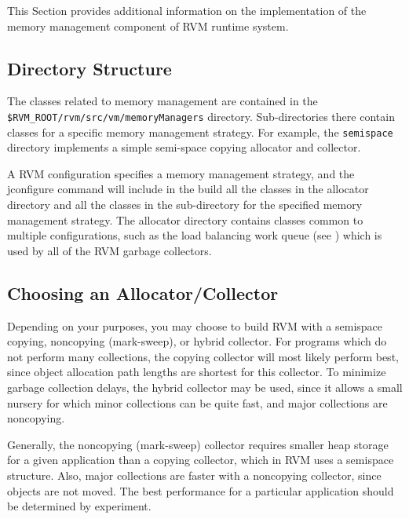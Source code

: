 This Section provides additional information on the implementation
of the memory management component of RVM runtime system.
 
\subsection{Directory Structure} \label{sssec:directories}
The classes related to memory management are contained in the 
{\tt \$RVM\_ROOT/rvm/src/vm/memoryManagers} directory.  Sub-directories
there
contain classes for a specific memory management strategy.
For example, the {\tt semispace} directory implements a
simple semi-space copying allocator and collector.

A RVM configuration specifies a memory management strategy, 
and the jconfigure command will include in the build all the
classes in the allocator directory and all the classes in the
sub-directory for the specified memory management strategy.
The allocator directory contains classes common to multiple
configurations, such as the load balancing work queue 
(see 
) which is used by all of the RVM garbage collectors.

\subsection{Choosing an Allocator/Collector} \label{ssec:choosinggc}
Depending on your purposes, you may choose to build RVM
with a semispace copying, noncopying (mark-sweep), or hybrid collector.
For programs which do not perform many collections, the
copying collector will most likely perform best, since object
allocation path lengths are shortest for this collector.  To
minimize garbage collection delays, the hybrid collector may
be used, since it allows a small nursery for which minor collections
can be quite fast, and major collections are noncopying.  

Generally, the noncopying (mark-sweep)
collector requires smaller heap storage for a given application	
than a copying collector, which in RVM uses a semispace structure.
Also, major collections are faster with a noncopying collector,
since objects are not moved.  The best performance for a particular	
application should be determined by experiment.


